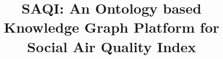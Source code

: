 \documentclass[runningheads]{llncs}
\newcommand*\samethanks[1][\value{footnote}]{\footnotemark[#1]}
\begin{document}
%
\title{SAQI: An Ontology based Knowledge Graph Platform for Social Air Quality Index}
%
%
%
%
%
\maketitle              %
%
\end{document}
